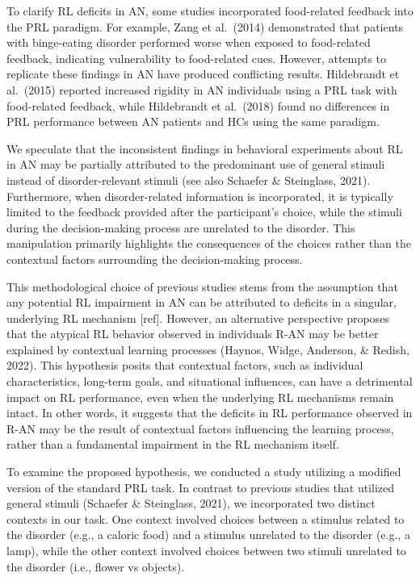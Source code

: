 \documentclass[
  man,floatsintext]{apa6}
\begin{document}
To clarify RL deficits in AN, some studies incorporated food-related feedback into the PRL paradigm. For example, Zang et al.~(2014) demonstrated that patients with binge-eating disorder performed worse when exposed to food-related feedback, indicating vulnerability to food-related cues. However, attempts to replicate these findings in AN have produced conflicting results. Hildebrandt et al.~(2015) reported increased rigidity in AN individuals using a PRL task with food-related feedback, while Hildebrandt et al.~(2018) found no differences in PRL performance between AN patients and HCs using the same paradigm.

We speculate that the inconsistent findings in behavioral experiments about RL in AN may be partially attributed to the predominant use of general stimuli instead of disorder-relevant stimuli (see also Schaefer \& Steinglass, 2021). Furthermore, when disorder-related information is incorporated, it is typically limited to the feedback provided after the participant's choice, while the stimuli during the decision-making process are unrelated to the disorder. This manipulation primarily highlights the consequences of the choices rather than the contextual factors surrounding the decision-making process.

This methodological choice of previous studies stems from the assumption that any potential RL impairment in AN can be attributed to deficits in a singular, underlying RL mechanism {[}ref{]}. However, an alternative perspective proposes that the atypical RL behavior observed in individuals R-AN may be better explained by contextual learning processes (Haynos, Widge, Anderson, \& Redish, 2022). This hypothesis posits that contextual factors, such as individual characteristics, long-term goals, and situational influences, can have a detrimental impact on RL performance, even when the underlying RL mechanisms remain intact. In other words, it suggests that the deficits in RL performance observed in R-AN may be the result of contextual factors influencing the learning process, rather than a fundamental impairment in the RL mechanism itself.

To examine the proposed hypothesis, we conducted a study utilizing a modified version of the standard PRL task. In contrast to previous studies that utilized general stimuli (Schaefer \& Steinglass, 2021), we incorporated two distinct contexts in our task. One context involved choices between a stimulus related to the disorder (e.g., a caloric food) and a stimulus unrelated to the disorder (e.g., a lamp), while the other context involved choices between two stimuli unrelated to the disorder (i.e., flower vs objects).
\end{document}
